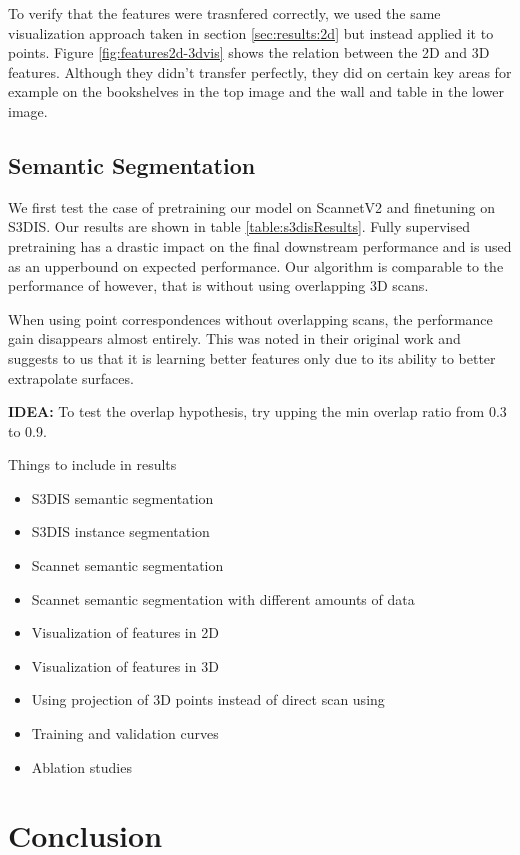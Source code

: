 \documentclass[10pt,twocolumn,letterpaper]{article}
\begin{document}
To verify that the features were trasnfered correctly, we used the same visualization approach taken in section \ref{sec:results:2d} but instead applied it to points. Figure \ref{fig:features2d-3dvis} shows the relation between the 2D and 3D features. Although they didn't transfer perfectly, they did on certain key areas for example on the bookshelves in the top image and the wall and table in the lower image.

\subsection{Semantic Segmentation}
\label{sec:results:3d}

We first test the case of pretraining our model on ScannetV2 and finetuning on S3DIS. Our results are shown in table \ref{table:s3disResults}. Fully supervised pretraining has a drastic impact on the final downstream performance and is used as an upperbound on expected performance. Our algorithm is comparable to the performance of \cite{xie2020pointcontrast} however, that is without using overlapping 3D scans.

When using point correspondences without overlapping scans, the performance gain disappears almost entirely. This was noted in their original work and suggests to us that it is learning better features only due to its ability to better extrapolate surfaces.

\textbf{IDEA:} To test the overlap hypothesis, try upping the min overlap ratio from 0.3 to 0.9.

Things to include in results
\begin{itemize}
    \item S3DIS semantic segmentation
    \item S3DIS instance segmentation
    \item Scannet semantic segmentation
    \item Scannet semantic segmentation with different amounts of data
    \item Visualization of features in 2D
    \item Visualization of features in 3D
    \item Using projection of 3D points instead of direct scan using \cite{katz2007Direct}
    \item Training and validation curves
    \item Ablation studies
\end{itemize}

\section{Conclusion}
\label{sec:conclusion}



\newpage
{\small
    
    
}
\end{document}
